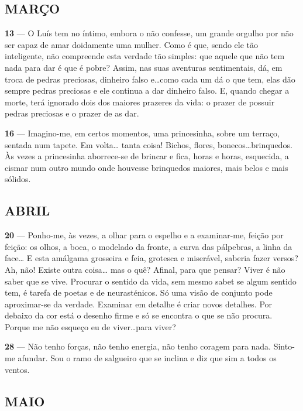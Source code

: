 \subsection{MARÇO}

\textbf{13} — O Luís tem no íntimo, embora o não confesse,
um grande orgulho por não ser capaz de amar 
doidamente uma mulher. Como é que, sendo ele tão 
inteligente, não compreende esta verdade tão simples: que
aquele que não tem nada para dar é que é pobre? Assim,
nas suas aventuras sentimentais, dá, em troca de pedras
preciosas, dinheiro falso e\ldots como cada um dá o que
tem, elas dão sempre pedras preciosas e ele continua a
dar dinheiro falso. E, quando chegar a morte, terá
ignorado dois dos maiores prazeres da vida: o prazer de
possuir pedras preciosas e o prazer de as dar.


\pagebreak


\textbf{16} — Imagino-me, em certos momentos, uma 
princesinha, sobre um terraço, sentada num tapete. Em volta\ldots
tanta coisa! Bichos, flores, bonecos\ldots brinquedos. Às
vezes a princesinha aborrece-se de brincar e fica, horas
e horas, esquecida, a cismar num outro mundo onde
houvesse brinquedos maiores, mais belos e mais
sólidos.

\subsection{ABRIL}

\textbf{20} — Ponho-me, às vezes, a olhar para o espelho e a
examinar-me, feição por feição: os olhos, a boca, o 
modelado da fronte, a curva das pálpebras, a linha da face\ldots
E esta amálgama grosseira e feia, grotesca e miserável,
saberia fazer versos? Ah, não! Existe outra coisa\ldots
mas o quê? Afinal, para que pensar? Viver é não saber
que se vive. Procurar o sentido da vida, sem mesmo
sabet se algum sentido tem, é tarefa de poetas e de
neurasténicos. Só uma visão de conjunto pode 
aproximar-se da verdade. Examinar em detalhe é criar novos
detalhes. Por debaixo da cor está o desenho firme e só
se encontra o que se não procura. Porque me não
esqueço eu de viver\ldots para viver?

\pagebreak



\textbf{28} — Não tenho forças, não tenho energia, não tenho
coragem para nada. Sinto-me afundar. Sou o ramo de
salgueiro que se inclina e diz que sim a todos os
ventos.

\subsection{MAIO}

